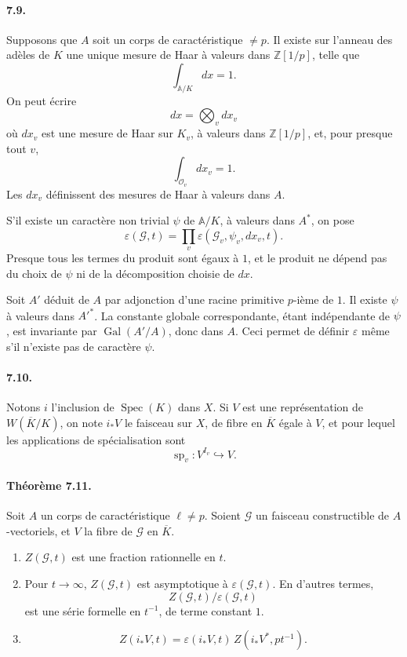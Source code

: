 \documentclass[10pt]{article}
\newcommand{\Gal}{\operatorname{Gal}}
\newcommand{\Spec}{\operatorname{Spec}}
\providecommand{\spc}{\operatorname{sp}}
\providecommand{\Spec}{\operatorname{Spec}}
\providecommand{\Gal}{\operatorname{Gal}}
\providecommand{\spc}{\operatorname{sp}}
\providecommand{\Gal}{\operatorname{Gal}}
\providecommand{\Spec}{\operatorname{Spec}}
\providecommand{\Spec}{\operatorname{Spec}}
\providecommand{\Gal}{\operatorname{Gal}}
\providecommand{\spc}{\operatorname{sp}}
\providecommand{\Gal}{\operatorname{Gal}}
\begin{document}
\paragraph{7.9.} Supposons que \(A\) soit un corps de caractéristique \(\ne p\). Il existe sur l'anneau des adèles de \(K\) une unique mesure de Haar à valeurs dans \(\mathbb Z[1/p]\), telle que
\[
\int_{\mathbb A/K}dx=1.
\]
On peut écrire
\[
dx=\bigotimes_v dx_v
\]
où \(dx_v\) est une mesure de Haar sur \(K_v\), à valeurs dans \(\mathbb Z[1/p]\), et, pour presque tout \(v\),
\[
\int_{\mathcal O_v}dx_v=1.
\]
Les \(dx_v\) définissent des mesures de Haar à valeurs dans \(A\).

S'il existe un caractère non trivial \(\psi\) de \(\mathbb A/K\), à valeurs dans \(A^*\), on pose
\[
\tag{7.9.1}
\varepsilon(\mathcal G,t)=\prod_v
\varepsilon(\mathcal G_v,\psi_v,dx_v,t).
\]
Presque tous les termes du produit sont égaux à \(1\), et le produit ne dépend pas du choix de \(\psi\) ni de la décomposition choisie de \(dx\).

Soit \(A'\) déduit de \(A\) par adjonction d'une racine primitive \(p\)-ième de \(1\). Il existe \(\psi\) à valeurs dans \(A'^*\). La constante globale correspondante, étant indépendante de \(\psi\), est invariante par \(\Gal(A'/A)\), donc dans \(A\). Ceci permet de définir \(\varepsilon\) même s'il n'existe pas de caractère \(\psi\).

\paragraph{7.10.} Notons \(i\) l'inclusion de \(\Spec(K)\) dans \(X\). Si \(V\) est une représentation de \(W(\overline K/K)\), on note \(i_*V\) le faisceau sur \(X\), de fibre en \(\overline K\) égale à \(V\), et pour lequel les applications de spécialisation sont
\[
\spc_v:V^{I_v}\hookrightarrow V.
\]

\paragraph{Théorème 7.11.} Soit \(A\) un corps de caractéristique \(\ell\ne p\). Soient \(\mathcal G\) un faisceau constructible de \(A\)-vectoriels, et \(V\) la fibre de \(\mathcal G\) en \(\overline K\).
\begin{enumerate}[label=(\roman*)]
\item \(Z(\mathcal G,t)\) est une fraction rationnelle en \(t\).
\item Pour \(t\to\infty\), \(Z(\mathcal G,t)\) est asymptotique à \(\varepsilon(\mathcal G,t)\). En d'autres termes,
\[
Z(\mathcal G,t)/\varepsilon(\mathcal G,t)
\]
est une série formelle en \(t^{-1}\), de terme constant \(1\).
\item
\[
Z(i_*V,t)=\varepsilon(i_*V,t)\,Z(i_*V^*,pt^{-1}).
\]
\end{enumerate}
\end{document}
